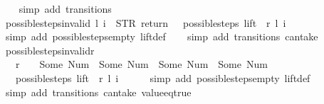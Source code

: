 \begin{isabellebody}
\ \ \isamarkupfalse%
\ {\isacharparenleft}simp\ add{\isacharcolon}\ transitions{\isacharparenright}%
\endisatagproof
{\isafoldproof}%
%
\isadelimproof
\isanewline
%
\endisadelimproof
\isanewline
{}\isamarkupfalse%
\ possible{\isacharunderscore}steps{\isacharunderscore}{}{\isacharunderscore}invalid{\isacharcolon}\ {\isachardoublequoteopen}{\isacharparenleft}l{\isacharcomma}\ i{\isacharparenright}\ {\isasymnoteq}\ {\isacharparenleft}STR\ {\isacharprime}{\isacharprime}return{\isacharprime}{\isacharprime}{\isacharcomma}\ {\isacharbrackleft}{\isacharbrackright}{\isacharparenright}\ {\isasymLongrightarrow}\ possible{\isacharunderscore}steps\ lift\ {}\ r\ l\ i\ {\isacharequal}\ {\isacharbraceleft}{\isacharbar}{\isacharbar}{\isacharbraceright}{\isachardoublequoteclose}\isanewline
%
\isadelimproof
\ \ %
\endisadelimproof
%
\isatagproof
{}\isamarkupfalse%
\ {\isacharparenleft}simp\ add{\isacharcolon}\ possible{\isacharunderscore}steps{\isacharunderscore}empty\ lift{\isacharunderscore}def{\isacharparenright}\isanewline
\ \ \isamarkupfalse%
\ {\isacharparenleft}simp\ add{\isacharcolon}\ transitions\ can{\isacharunderscore}take{\isacharparenright}%
\endisatagproof
{\isafoldproof}%
%
\isadelimproof
\isanewline
%
\endisadelimproof
\isanewline
{}\isamarkupfalse%
\ possible{\isacharunderscore}steps{\isacharunderscore}{}{\isacharunderscore}invalid{\isacharunderscore}r{}{\isacharcolon}\isanewline
\ \ \ {\isachardoublequoteopen}r\ {\isachardollar}\ {}\ {\isasymnotin}\ {\isacharbraceleft}Some\ {\isacharparenleft}Num\ {}{\isacharparenright}{\isacharcomma}\ Some\ {\isacharparenleft}Num\ {}{\isacharparenright}{\isacharcomma}\ Some\ {\isacharparenleft}Num\ {}{\isacharparenright}{\isacharcomma}\ Some\ {\isacharparenleft}Num\ {}{\isacharparenright}{\isacharbraceright}{\isachardoublequoteclose}\isanewline
\ \ \ {\isachardoublequoteopen}possible{\isacharunderscore}steps\ lift\ {}\ r\ l\ i\ {\isacharequal}\ {\isacharbraceleft}{\isacharbar}{\isacharbar}{\isacharbraceright}{\isachardoublequoteclose}\isanewline
%
\isadelimproof
\ \ %
\endisadelimproof
%
\isatagproof
{}\isamarkupfalse%
\ {\isacharparenleft}simp\ add{\isacharcolon}\ possible{\isacharunderscore}steps{\isacharunderscore}empty\ lift{\isacharunderscore}def{\isacharparenright}\isanewline
\ \ \isamarkupfalse%
\ {\isacharparenleft}simp\ add{\isacharcolon}\ transitions\ can{\isacharunderscore}take\ value{\isacharunderscore}eq{\isacharunderscore}true{\isacharparenright}\isanewline

\end{isabellebody}
